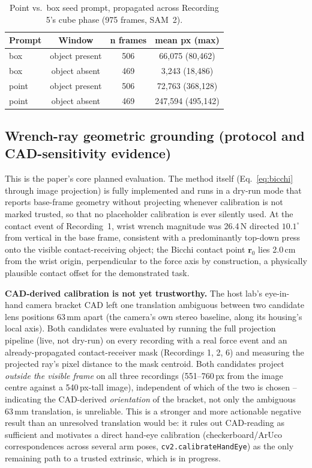 \documentclass[letterpaper, 10pt, journal, twoside]{IEEEtran}
\begin{document}
\begin{table}[t]
\centering
\caption{Point vs.\ box seed prompt, propagated across Recording 5's
cube phase (975 frames, SAM~2).}
\label{tab:seedablation}
\begin{tabular}{lccc}
\toprule
\textbf{Prompt} & \textbf{Window} & \textbf{n frames} & \textbf{mean px (max)} \\
\midrule
box   & object present & 506 & 66{,}075 (80{,}462) \\
box   & object absent  & 469 & 3{,}243 (18{,}486) \\
point & object present & 506 & 72{,}763 (368{,}128) \\
point & object absent  & 469 & 247{,}594 (495{,}142) \\
\bottomrule
\end{tabular}
\end{table}

\subsection{Wrench-ray geometric grounding (protocol and CAD-sensitivity evidence)}
\label{sec:calib}

This is the paper's core planned evaluation. The method itself
(Eq.~\ref{eq:bicchi} through image projection) is fully implemented and
runs in a dry-run mode that reports base-frame geometry without
projecting whenever calibration is not marked trusted, so that no
placeholder calibration is ever silently used. At the contact event of
Recording~1, wrist wrench magnitude was 26.4\,N directed
$10.1^\circ$ from vertical in the base frame, consistent with a
predominantly top-down press onto the visible contact-receiving object;
the Bicchi contact point $\mathbf{r}_0$ lies 2.0\,cm from the wrist
origin, perpendicular to the force axis by construction, a physically
plausible contact offset for the demonstrated task.

\textbf{CAD-derived calibration is not yet trustworthy.} The host lab's
eye-in-hand camera bracket CAD left one translation ambiguous between two
candidate lens positions 63\,mm apart (the camera's own stereo baseline,
along its housing's local axis). Both candidates were evaluated by
running the full projection pipeline (live, not dry-run) on every
recording with a real force event and an already-propagated
contact-receiver mask (Recordings 1, 2, 6) and measuring the projected
ray's pixel distance to the mask centroid. Both candidates project
\emph{outside the visible frame} on all three recordings (551--760\,px
from the image centre against a 540\,px-tall image), independent of
which of the two is chosen -- indicating the CAD-derived
\emph{orientation} of the bracket, not only the ambiguous 63\,mm
translation, is unreliable. This is a stronger and more actionable
negative result than an unresolved translation would be: it rules out
CAD-reading as sufficient and motivates a direct hand-eye calibration
(checkerboard/ArUco correspondences across several arm poses,
\texttt{cv2.calibrateHandEye}) as the only remaining path to a trusted
extrinsic, which is in progress.
\end{document}
